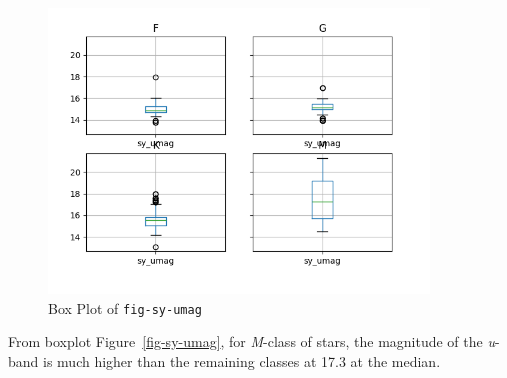 \documentclass[
  letterpaper,
  DIV=11,
  numbers=noendperiod]{scrartcl}
\begin{document}
\begin{figure}[H]

{\centering \includegraphics[width=0.9\textwidth,height=\textheight]{../results/figures/sy_umag.png}

}

\caption{Box Plot of \texttt{fig-sy-umag}}

\end{figure}%

From boxplot Figure~\ref{fig-sy-umag}, for \emph{M}-class of stars, the
magnitude of the \emph{u}-band is much higher than the remaining classes
at 17.3 at the median.
\end{document}
